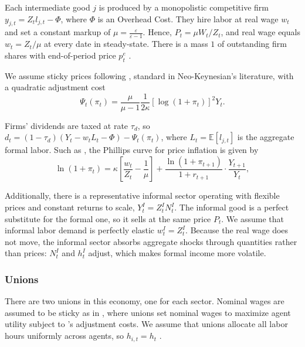\documentclass[12pt]{article}
\newcommand{\E}{\mathbb{E}}
\begin{document}
Each intermediate good $j$ is produced by a monopolistic competitive firm
$y_{j,t} = Z_{t} l_{j,t} - \Phi $, where $\Phi$ is an Overhead Cost. They hire labor at
real wage $w_t$ and set a constant markup of $\mu = \frac{\varepsilon}{\varepsilon-1}$.
Hence, $P_t = \mu W_t/Z_t$, and real wage equals $w_t = Z_t/\mu$ at every date in
steady-state. There is a mass $1$ of outstanding firm shares with end-of-period price
$p_t^e$ \parencite{auclert2025fiscal}.

We assume sticky prices following \textcite{rotemberg1982monopolistic}, standard in
Neo-Keynesian's literature, with a quadratic adjustment cost
\[
\Psi_t(\pi_t) = \frac{\mu}{\mu-1} \frac{1}{2\kappa}
\left[ \log (1+\pi_t) \right]^2 Y_t.
\]

Firms' dividends are taxed at rate $\tau_d$, so
$d_t = (1-\tau_d) (Y_t - w_t L_t - \Phi) - \Psi_t(\pi_t)$, where $L_t = \E[l_{j,t}]$ is
the aggregate formal labor. Such as \textcite{hagedorn2019fiscal}, the Phillips curve
for price inflation is given by
\[
\ln(1+\pi_t) = \kappa \left[ \frac{w_t}{Z_t} - \frac{1}{\mu}
\right] + \frac{\ln(1+\pi_{t+1})}{1+r_{t+1}} \cdot \frac{Y_{t+1}}{Y_t},
\]

Additionally, there is a representative informal sector operating with flexible prices
and constant returns to scale, $Y_t^I = Z_t^I N_t^I$. The informal good is a perfect
substitute for the formal one, so it sells at the same price $P_t$. We assume that
informal labor demand is perfectly elastic $w_t^I = Z_t^I$. Because the real wage
does not move, the informal sector absorbs aggregate shocks through quantities rather
than prices: $N_t^I$ and $h_t^I$ adjust, which makes formal income more volatile.

\subsubsection*{Unions}
There are two unions in this economy, one for each sector. Nominal wages are assumed to
be sticky as in \textcite{erceg2000optimal}, where unions set nominal wages to maximize
agent utility subject to \textcite{rotemberg1982monopolistic}'s adjustment costs. We
assume that unions allocate all labor hours uniformly across agents, so
$ h_{i,t} = h_t $ \parencite{auclert2025fiscal}.
\end{document}
